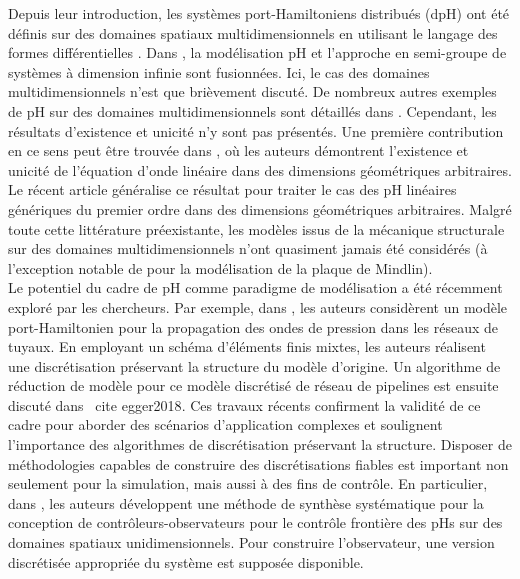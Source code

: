 Depuis leur introduction, les systèmes port-Hamiltoniens distribués (dpH) ont été définis sur des domaines spatiaux multidimensionnels en utilisant le langage des formes différentielles \cite{vanderschaft2002}. Dans \cite{villegas2007}, la modélisation pH et l'approche en semi-groupe de systèmes à dimension infinie sont fusionnées. Ici, le cas des domaines multidimensionnels n'est que brièvement discuté. De nombreux autres exemples de pH sur des domaines multidimensionnels sont détaillés dans \cite[Chapitre 4]{duindam2009}. Cependant, les résultats d'existence et unicité n'y sont pas présentés. Une première contribution en ce sens peut être trouvée dans \cite{zwart2015wave}, où les auteurs démontrent l'existence et unicité de l'équation d'onde linéaire dans des dimensions géométriques arbitraires. Le récent article \cite{skrepek2019wellposedness} généralise ce résultat pour traiter le cas des pH linéaires génériques du premier ordre dans des dimensions géométriques arbitraires. Malgré toute cette littérature préexistante, les modèles issus de la mécanique structurale sur des domaines multidimensionnels n'ont quasiment jamais été considérés (à l'exception notable de \cite{macchelli2005mindlin} pour la modélisation de la plaque de Mindlin). \\

Le potentiel du cadre de pH comme paradigme de modélisation a été récemment exploré par les chercheurs. Par exemple, dans \cite{egger2018damped}, les auteurs considèrent un modèle port-Hamiltonien pour la propagation des ondes de pression dans les réseaux de tuyaux. En employant un schéma d'éléments finis mixtes, les auteurs réalisent une discrétisation préservant la structure du modèle d'origine. Un algorithme de réduction de modèle pour ce modèle discrétisé de réseau de pipelines est ensuite discuté dans \ cite {egger2018}. Ces travaux récents confirment la validité de ce cadre pour aborder des scénarios d'application complexes et soulignent l'importance des algorithmes de discrétisation préservant la structure. Disposer de méthodologies capables de construire des discrétisations fiables est important non seulement pour la simulation, mais aussi à des fins de contrôle. En particulier, dans \cite{toledo2020}, les auteurs développent une méthode de synthèse systématique pour la conception de contrôleurs-observateurs pour le contrôle frontière des pHs sur des domaines spatiaux unidimensionnels. Pour construire l'observateur, une version discrétisée appropriée du système est supposée disponible. \\

